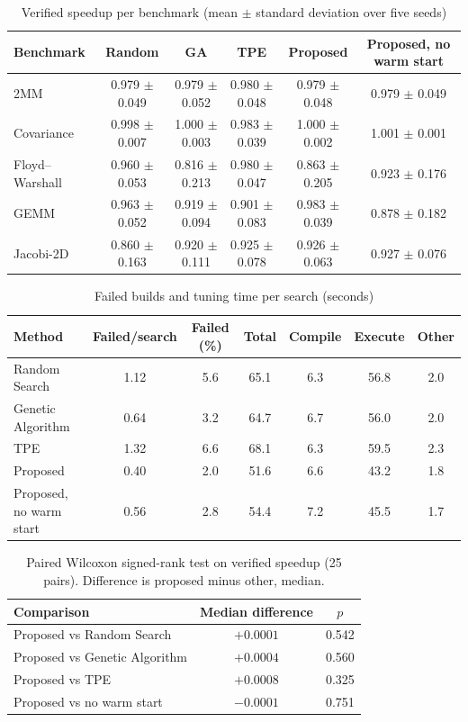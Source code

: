 \begin{table}[t]
\caption{Verified speedup per benchmark (mean $\pm$ standard deviation over five seeds)}
\label{tab:perbench}
\centering\small
\begin{tabular}{@{}lccccc@{}}
\toprule
Benchmark & Random & GA & TPE & Proposed & Proposed, no warm start\\
\midrule
2MM & 0.979 $\pm$ 0.049 & 0.979 $\pm$ 0.052 & 0.980 $\pm$ 0.048 & 0.979 $\pm$ 0.048 & 0.979 $\pm$ 0.049\\
Covariance & 0.998 $\pm$ 0.007 & 1.000 $\pm$ 0.003 & 0.983 $\pm$ 0.039 & 1.000 $\pm$ 0.002 & 1.001 $\pm$ 0.001\\
Floyd--Warshall & 0.960 $\pm$ 0.053 & 0.816 $\pm$ 0.213 & 0.980 $\pm$ 0.047 & 0.863 $\pm$ 0.205 & 0.923 $\pm$ 0.176\\
GEMM & 0.963 $\pm$ 0.052 & 0.919 $\pm$ 0.094 & 0.901 $\pm$ 0.083 & 0.983 $\pm$ 0.039 & 0.878 $\pm$ 0.182\\
Jacobi-2D & 0.860 $\pm$ 0.163 & 0.920 $\pm$ 0.111 & 0.925 $\pm$ 0.078 & 0.926 $\pm$ 0.063 & 0.927 $\pm$ 0.076\\
\bottomrule
\end{tabular}
\end{table}

\begin{table}[t]
\caption{Failed builds and tuning time per search (seconds)}
\label{tab:cost}
\centering\footnotesize
\setlength{\tabcolsep}{3pt}
\begin{tabular}{@{}lcccccc@{}}
\toprule
Method & Failed/search & Failed (\%) & Total & Compile & Execute & Other\\
\midrule
Random Search & 1.12 & 5.6 & 65.1 & 6.3 & 56.8 & 2.0\\
Genetic Algorithm & 0.64 & 3.2 & 64.7 & 6.7 & 56.0 & 2.0\\
TPE & 1.32 & 6.6 & 68.1 & 6.3 & 59.5 & 2.3\\
Proposed & 0.40 & 2.0 & 51.6 & 6.6 & 43.2 & 1.8\\
Proposed, no warm start & 0.56 & 2.8 & 54.4 & 7.2 & 45.5 & 1.7\\
\bottomrule
\end{tabular}
\end{table}

\begin{table}[t]
\caption{Paired Wilcoxon signed-rank test on verified speedup (25 pairs). Difference is proposed minus other, median.}
\label{tab:wilcoxon}
\centering\small
\begin{tabular}{@{}lcc@{}}
\toprule
Comparison & Median difference & $p$\\
\midrule
Proposed vs Random Search & $+0.0001$ & 0.542\\
Proposed vs Genetic Algorithm & $+0.0004$ & 0.560\\
Proposed vs TPE & $+0.0008$ & 0.325\\
Proposed vs no warm start & $-0.0001$ & 0.751\\
\bottomrule
\end{tabular}
\end{table}

